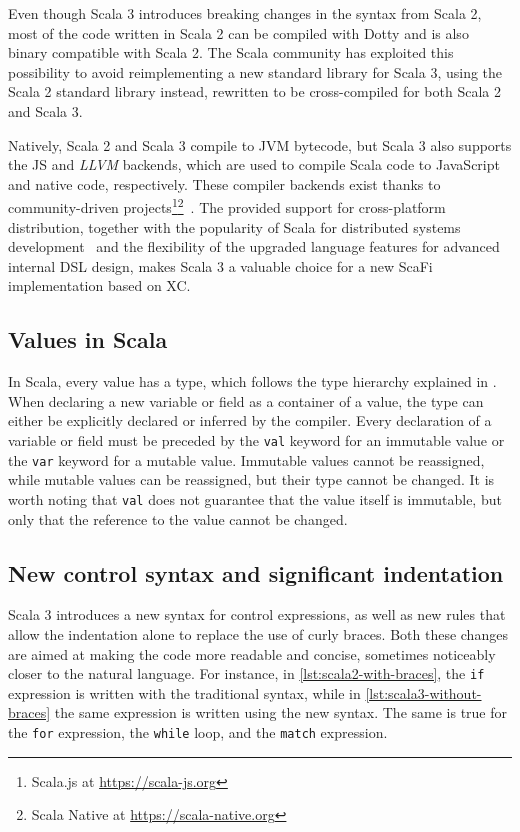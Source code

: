 Even though Scala 3 introduces breaking changes in the syntax from Scala 2, most of the code written in Scala 2 can be compiled with Dotty and is also binary compatible with Scala 2.
%
The Scala community has exploited this possibility to avoid reimplementing a new standard library for Scala 3, using the Scala 2 standard library instead, rewritten to be cross-compiled for both Scala 2 and Scala 3.

Natively, Scala 2 and Scala 3 compile to \ac{JVM} bytecode, but Scala 3 also supports the \ac{JS} and \textit{LLVM} backends, which are used to compile Scala code to JavaScript and native code, respectively.
%
These compiler backends exist thanks to community-driven projects\footnote{Scala.js at \url{https://scala-js.org}}\footnote{Scala Native at \url{https://scala-native.org}}~\cite{scala-js}.
%
The provided support for cross-platform distribution, together with the popularity of Scala for distributed systems development~\cite{scala-popularity} and the flexibility of the upgraded language features for advanced internal \ac{DSL} design, makes Scala 3 a valuable choice for a new ScaFi implementation based on \ac{XC}.

\subsection{Values in Scala}

In Scala, every value has a type, which follows the type hierarchy explained in .
%
When declaring a new variable or field as a container of a value, the type can either be explicitly declared or inferred by the compiler.
%
Every declaration of a variable or field must be preceded by the \texttt{val} keyword for an immutable value or the \texttt{var} keyword for a mutable value.
%
Immutable values cannot be reassigned, while mutable values can be reassigned, but their type cannot be changed.
%
It is worth noting that \texttt{val} does not guarantee that the value itself is immutable, but only that the reference to the value cannot be changed.


\subsection{New control syntax and significant indentation}

Scala 3 introduces a new syntax for control expressions, as well as new rules that allow the indentation alone to replace the use of curly braces.
%
Both these changes are aimed at making the code more readable and concise, sometimes noticeably closer to the natural language.
%
For instance, in \cref{lst:scala2-with-braces}, the \texttt{if} expression is written with the traditional syntax, while in \cref{lst:scala3-without-braces} the same expression is written using the new syntax.
%
The same is true for the \texttt{for} expression, the \texttt{while} loop, and the \texttt{match} expression.

